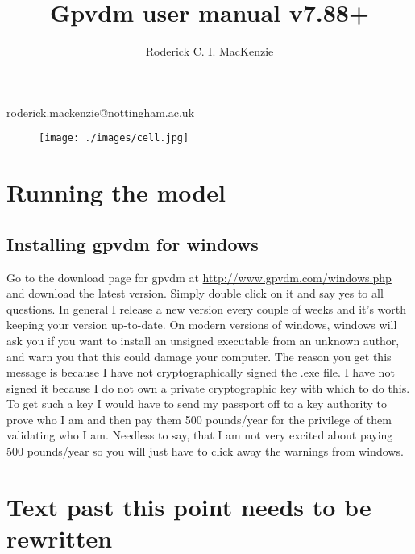 \documentclass[a4paper,12pt]{article}
\begin{document}
\title{Gpvdm user manual v7.88+}

\author{Roderick C. I. MacKenzie}


\maketitle




\centerline{roderick.mackenzie@nottingham.ac.uk}


\begin{figure}[ht!]
\centering
\texttt{[image: ./images/cell.jpg]}
\label{overflow}
\end{figure}

\newpage

\newpage

\section{Running the model}

\subsection{Installing gpvdm for windows}
Go to the download page for gpvdm at \url{http://www.gpvdm.com/windows.php} and download the latest version.  Simply double click on it and say yes to all questions.  In general I release a new version every couple of weeks and it's worth keeping your version up-to-date. On modern versions of windows, windows will ask you if you want to install an unsigned executable from an unknown author, and warn you that this could damage your computer.  The reason you get this message is because I have not cryptographically signed the .exe file. I have not signed it because I do not own a private cryptographic key with which to do this.  To get such a key I would have to send my passport off to a key authority to prove who I am and then pay them 500 pounds/year for the privilege of them validating who I am.  Needless to say, that I am not very excited about paying 500 pounds/year so you will just have to click away the warnings from windows.











\section{Text past this point needs to be rewritten}






\end{document}
